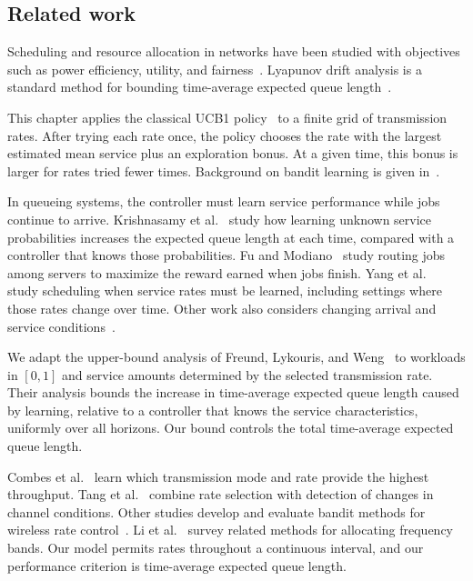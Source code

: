 \subsection{Related work}

Scheduling and resource allocation in networks have been studied with
objectives such as power efficiency, utility, and
fairness~\cite{Cruz2003,palomar2006tutorial,Songwu1999}. Lyapunov drift analysis is a
standard method for bounding time-average expected queue
length~\cite{neely2010stochastic}.

This chapter applies the classical UCB1 policy~\cite{Auer2002FinitetimeAO}
to a finite grid of transmission rates. After trying each rate once, the
policy chooses the rate with the largest estimated mean service plus an
exploration bonus. At a given time, this bonus is larger for rates tried
fewer times.
Background on bandit learning is given
in~\cite{Lai1985,cesa2006prediction,bubeck2012regret,lattimore2020bandit}.

In queueing systems, the controller must learn service performance while
jobs continue to arrive. Krishnasamy et al.~\cite{Krishnasamy2016,Krishnasamy2020}
study how learning unknown service probabilities increases the expected
queue length at each time, compared with a controller that knows those
probabilities. Fu and Modiano~\cite{Fu2023} study routing jobs among servers
to maximize the reward earned when jobs finish. Yang et al.~\cite{Yang2023}
study scheduling when service rates must be learned, including settings
where those rates change over time. Other work also considers changing
arrival and service conditions~\cite{Huang2024,Nguyen}.

We adapt the upper-bound analysis of Freund, Lykouris, and
Weng~\cite{Freund2023} to workloads in $[0,1]$ and service amounts determined
by the selected transmission rate. Their analysis bounds the increase in
time-average expected queue length caused by learning, relative to a
controller that knows the service characteristics, uniformly over all
horizons. Our bound controls the total time-average expected queue length.

Combes et al.~\cite{combes2019optimal} learn which transmission mode and
rate provide the highest throughput. Tang et al.~\cite{tang_joint_2021}
combine rate selection with detection of changes in channel conditions.
Other studies develop and evaluate bandit methods for wireless rate
control~\cite{cho_use_2023,tong_rate_2023,le_multi-armed_2024}.
Li et al.~\cite{li2020multi} survey related methods for allocating frequency
bands. Our model permits rates throughout a continuous interval, and our
performance criterion is time-average expected queue length.

